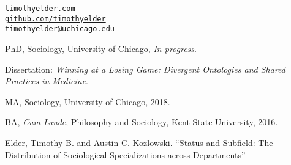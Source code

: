 \documentclass[11pt,article,oneside]{memoir}
\makeatletter
\def\myemail{timothyelder@uchicago.edu}
\def\myweb{timothyelder.com}
\makeatother
\begin{document}
\begin{minipage}[t]{2.95in}

\end{minipage}
\hfill
\hfill
\begin{minipage}[t]{1.5in}
  \flushright \footnotesize  \addressblock
  {\scriptsize  \texttt{\href{http://timothyelder.com/}{\myweb}}}  \\
  {\scriptsize  \texttt{\href{https://github.com/timothyelder}{github.com/timothyelder} } \\
  {\scriptsize  \texttt{\href{mailto:\myemail}{\myemail}} }}
\end{minipage}

\medskip

\reversemarginpar

\bigskip



\ind PhD, Sociology, University of Chicago, \emph{In progress}.

\ind \hspace{0.35in} \footnotesize Dissertation: \emph{Winning at a Losing Game: Divergent Ontologies and Shared Practices in Medicine}. \normalsize \vspace{0.05in}

\ind MA, Sociology, University of Chicago, 2018.

\ind BA, \emph{Cum Laude}, Philosophy and Sociology, Kent State University, 2016. \vspace{0.05in}

\bigskip


\ind Elder, Timothy B. and Austin C. Kozlowski. “Status and Subfield: The Distribution of Sociological Specializations across Departments” \vspace{0.05in}
\end{document}
